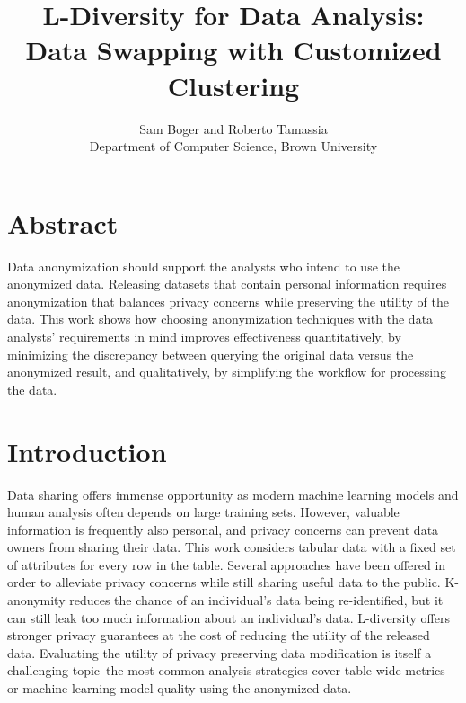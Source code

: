 

\date{}

\title{\Large \bf L-Diversity for Data Analysis:\\
  Data Swapping with Customized Clustering}

\author{
{\rm Sam Boger and Roberto Tamassia} \\
Department of Computer Science, Brown University

} %

\maketitle
\section*{Abstract}
Data anonymization should support the analysts who intend to use the anonymized data. Releasing datasets that contain personal information requires anonymization that balances privacy concerns while preserving the utility of the data. This work shows how choosing anonymization techniques with the data analysts' requirements in mind improves effectiveness quantitatively, by minimizing the discrepancy between querying the original data versus the anonymized result, and qualitatively, by simplifying the workflow for processing the data.

\section{Introduction}
Data sharing offers immense opportunity as modern machine learning models and human analysis often depends on large training sets. However, valuable information is frequently also personal, and privacy concerns can prevent data owners from sharing their data. This work considers tabular data with a fixed set of attributes for every row in the table. Several approaches have been offered in order to alleviate privacy concerns while still sharing useful data to the public. K-anonymity reduces the chance of an individual’s data being re-identified, but it can still leak too much information about an individual's data. L-diversity offers stronger privacy guarantees at the cost of reducing the utility of the released data. Evaluating the utility of privacy preserving data modification is itself a challenging topic--the most common analysis strategies cover table-wide metrics or machine learning model quality using the anonymized data.

